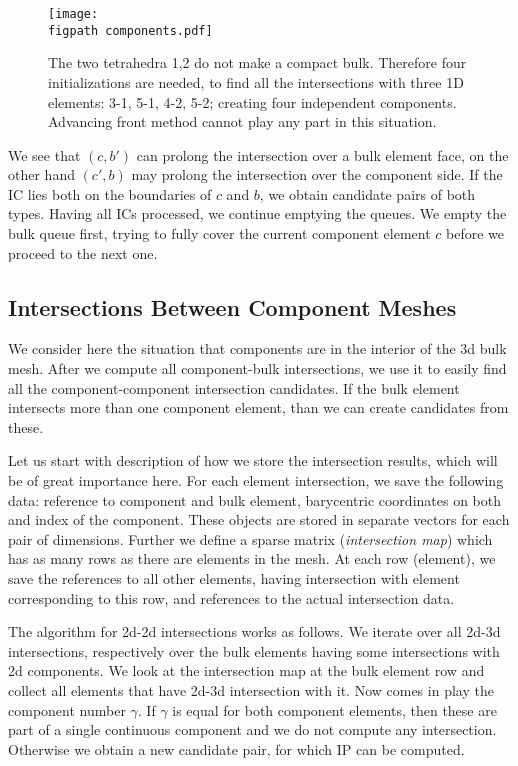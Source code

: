 \documentclass{elsarticle}
\newcommand{\figpath}{figures/}
\begin{document}
\begin{figure}[!htb]
    \centering
    \texttt{[image: \\figpath components.pdf]}
    \caption{The two tetrahedra 1,2 do not make a compact bulk. Therefore four initializations are needed,
    to find all the intersections with three 1D elements: 3-1, 5-1, 4-2, 5-2; creating four independent components. Advancing front method cannot play any part in this situation.}
    \label{fig:components}
\end{figure}

We see that $(c, b')$ can prolong the intersection over a bulk element face, on the other hand $(c', b)$ 
may prolong the intersection over the component side. If the IC lies both on the boundaries of $c$ and $b$,
we obtain candidate pairs of both types. Having all ICs processed, we continue emptying the queues. We empty the bulk queue first,
trying to fully cover the current component element $c$ before we proceed to the next one. 

\subsection{Intersections Between Component Meshes}
\label{sec:components}
We consider here the situation that components are in the interior of the 3d bulk mesh. After we compute
all component-bulk intersections, we use it to easily find all the component-component intersection candidates.
If the bulk element intersects more than one component element, than we can create candidates from these.

Let us start with description of how we store the intersection results, which will be of great importance here.
For each element intersection, we save the following data: reference to component and bulk element, 
barycentric coordinates on both and index of the component. These objects are stored in separate vectors for each pair 
of dimensions. Further we define a sparse matrix (\emph{intersection map}) which has as many rows as there are elements in the mesh.
At each row (element), we save the references to all other elements, having intersection with element corresponding to this row, 
and references to the actual intersection data.

The algorithm for 2d-2d intersections works as follows. We iterate over all 2d-3d intersections, respectively over
the bulk elements having some intersections with 2d components. We look at the intersection map at the
bulk element row and collect all elements that have 2d-3d intersection with it.
Now comes in play the component number $\gamma$. If $\gamma$ is equal for both component elements, then 
these are part of a single continuous component and we do not compute any intersection.
Otherwise we obtain a new candidate pair, for which IP can be computed.
\end{document}
